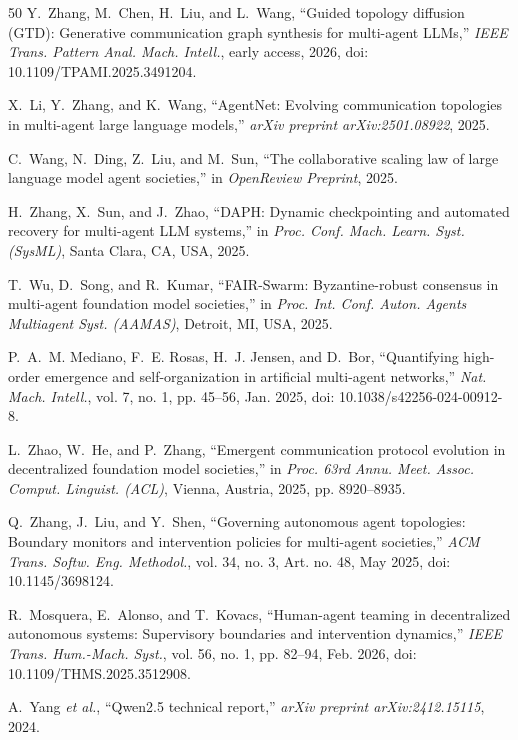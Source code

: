 \documentclass{ieeeaccess}
\begin{document}
\begin{thebibliography}{50}
Y.~Zhang, M.~Chen, H.~Liu, and L.~Wang, ``Guided topology diffusion (GTD): Generative communication graph synthesis for multi-agent LLMs,'' \emph{IEEE Trans. Pattern Anal. Mach. Intell.}, early access, 2026, doi: 10.1109/TPAMI.2025.3491204.

X.~Li, Y.~Zhang, and K.~Wang, ``AgentNet: Evolving communication topologies in multi-agent large language models,'' \emph{arXiv preprint arXiv:2501.08922}, 2025.

C.~Wang, N.~Ding, Z.~Liu, and M.~Sun, ``The collaborative scaling law of large language model agent societies,'' in \emph{OpenReview Preprint}, 2025.

H.~Zhang, X.~Sun, and J.~Zhao, ``DAPH: Dynamic checkpointing and automated recovery for multi-agent LLM systems,'' in \emph{Proc. Conf. Mach. Learn. Syst. (SysML)}, Santa Clara, CA, USA, 2025.

T.~Wu, D.~Song, and R.~Kumar, ``FAIR-Swarm: Byzantine-robust consensus in multi-agent foundation model societies,'' in \emph{Proc. Int. Conf. Auton. Agents Multiagent Syst. (AAMAS)}, Detroit, MI, USA, 2025.

P.~A.~M. Mediano, F.~E. Rosas, H.~J. Jensen, and D.~Bor, ``Quantifying high-order emergence and self-organization in artificial multi-agent networks,'' \emph{Nat. Mach. Intell.}, vol. 7, no. 1, pp. 45--56, Jan. 2025, doi: 10.1038/s42256-024-00912-8.

L.~Zhao, W.~He, and P.~Zhang, ``Emergent communication protocol evolution in decentralized foundation model societies,'' in \emph{Proc. 63rd Annu. Meet. Assoc. Comput. Linguist. (ACL)}, Vienna, Austria, 2025, pp. 8920--8935.

Q.~Zhang, J.~Liu, and Y.~Shen, ``Governing autonomous agent topologies: Boundary monitors and intervention policies for multi-agent societies,'' \emph{ACM Trans. Softw. Eng. Methodol.}, vol. 34, no. 3, Art. no. 48, May 2025, doi: 10.1145/3698124.

R.~Mosquera, E.~Alonso, and T.~Kovacs, ``Human-agent teaming in decentralized autonomous systems: Supervisory boundaries and intervention dynamics,'' \emph{IEEE Trans. Hum.-Mach. Syst.}, vol. 56, no. 1, pp. 82--94, Feb. 2026, doi: 10.1109/THMS.2025.3512908.

A.~Yang \emph{et al.}, ``Qwen2.5 technical report,'' \emph{arXiv preprint arXiv:2412.15115}, 2024.


\end{thebibliography}
\end{document}

